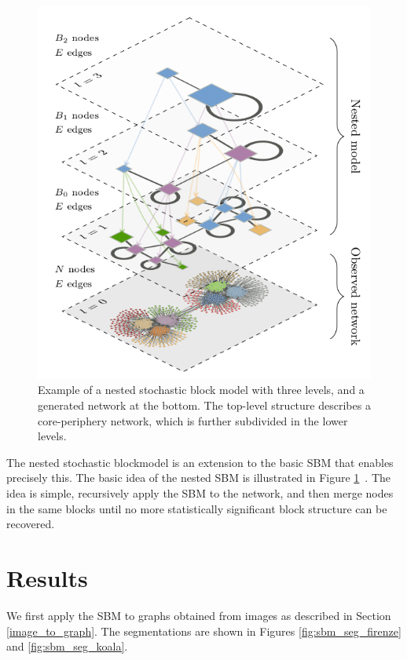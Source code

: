 \documentclass[conference]{IEEEtran}
\begin{document}
\begin{figure}[ht]
    \centering
    \includegraphics[width=\linewidth]{images/nested_blockmodel.png}
    \caption{Example of a nested stochastic block model with three levels, and a generated network at the bottom. The top-level structure describes a core-periphery network, which is further subdivided in the lower levels.}
    \label{fig:nested_blockmodel}
\end{figure}

The nested stochastic blockmodel is an extension to the basic SBM that enables precisely this. The basic idea of the nested SBM is illustrated in Figure \ref{fig:nested_blockmodel}~\cite{peixoto2014hierarchical}. The idea is simple, recursively apply the SBM to the network, and then merge nodes in the same blocks until no more statistically significant block structure can be recovered.

\section{Results}\label{results}

We first apply the SBM to graphs obtained from images as described in Section \ref{image_to_graph}. The segmentations are shown in Figures \ref{fig:sbm_seg_firenze} and \ref{fig:sbm_seg_koala}.
\end{document}
